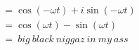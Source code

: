 \documentclass[preview]{standalone}
\begin{document}
\begin{align*}
&=\cos{(-\omega t)}+i\sin{(-\omega t)} \\ &= \cos{(\omega t)}-\sin{(\omega t)} \\ &= \ big \ black \ niggaz \ in \ my \ ass
\end{align*}
\end{document}
